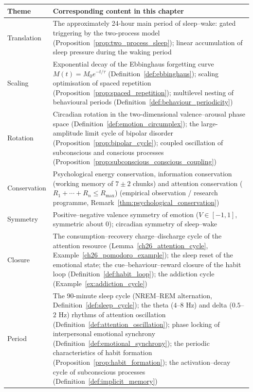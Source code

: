\begin{center}
\begin{tabular}{>{\centering\arraybackslash}p{2.8cm}>{\centering\arraybackslash}p{9.9cm}}
\toprule
Theme & Corresponding content in this chapter \\
\midrule
Translation & The approximately 24-hour main period of sleep--wake: gated triggering by the two-process model (Proposition~\ref{prop:two_process_sleep}); linear accumulation of sleep pressure during the waking period \\
Scaling & Exponential decay of the Ebbinghaus forgetting curve $M(t) = M_0 e^{-t/\tau}$ (Definition~\ref{def:ebbinghaus}); scaling optimisation of spaced repetition (Proposition~\ref{prop:spaced_repetition}); multilevel nesting of behavioural periods (Definition~\ref{def:behaviour_periodicity}) \\
Rotation & Circadian rotation in the two-dimensional valence--arousal phase space (Definition~\ref{def:emotion_circumplex}); the large-amplitude limit cycle of bipolar disorder (Proposition~\ref{prop:bipolar_cycle}); coupled oscillation of subconscious and conscious processes (Proposition~\ref{prop:subconscious_conscious_coupling}) \\
Conservation & Psychological energy conservation, information conservation (working memory of $7\pm2$ chunks) and attention conservation ($R_1+\cdots+R_n \le R_{\max}$) (empirical observation / research programme, Remark~\ref{thm:psychological_conservation}) \\
Symmetry & Positive--negative valence symmetry of emotion ($V \in [-1,1]$, symmetric about $0$); circadian symmetry of sleep--wake \\
Closure & The consumption--recovery charge--discharge cycle of the attention resource (Lemma~\ref{ch26_attention_cycle}, Example~\ref{ch26_pomodoro_example}); the sleep reset of the emotional state; the cue--behaviour--reward closure of the habit loop (Definition~\ref{def:habit_loop}); the addiction cycle (Example~\ref{ex:addiction_cycle}) \\
Period & The 90-minute sleep cycle (NREM--REM alternation, Definition~\ref{def:sleep_cycle}); the theta ($4$--$8$ Hz) and delta ($0.5$--$2$ Hz) rhythms of attention oscillation (Definition~\ref{def:attention_oscillation}); phase locking of interpersonal emotional synchrony (Definition~\ref{def:emotional_synchrony}); the periodic characteristics of habit formation (Proposition~\ref{prop:habit_formation}); the activation--decay cycle of subconscious processes (Definition~\ref{def:implicit_memory}) \\
\bottomrule
\end{tabular}
\end{center}

